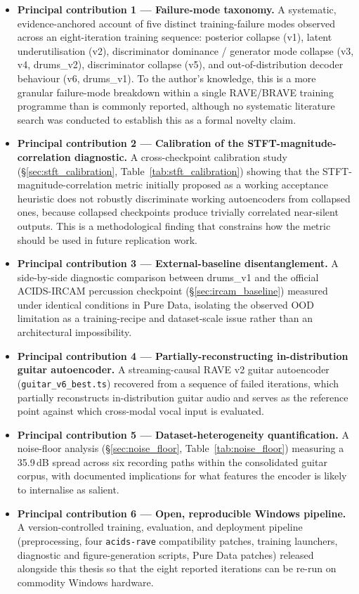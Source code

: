 \documentclass[a4paper,11pt,oneside,openany]{book}
\begin{document}
\begin{itemize}
\item \textbf{Principal contribution 1 --- Failure-mode taxonomy.} A systematic, evidence-anchored account of five distinct training-failure modes observed across an eight-iteration training sequence: posterior collapse (v1), latent underutilisation (v2), discriminator dominance / generator mode collapse (v3, v4, drums\_v2), discriminator collapse (v5), and out-of-distribution decoder behaviour (v6, drums\_v1). To the author's knowledge, this is a more granular failure-mode breakdown within a single RAVE/BRAVE training programme than is commonly reported, although no systematic literature search was conducted to establish this as a formal novelty claim.
\item \textbf{Principal contribution 2 --- Calibration of the STFT-magnitude-correlation diagnostic.} A cross-checkpoint calibration study (\S\ref{sec:stft_calibration}, Table~\ref{tab:stft_calibration}) showing that the STFT-magnitude-correlation metric initially proposed as a working acceptance heuristic does not robustly discriminate working autoencoders from collapsed ones, because collapsed checkpoints produce trivially correlated near-silent outputs. This is a methodological finding that constrains how the metric should be used in future replication work.
\item \textbf{Principal contribution 3 --- External-baseline disentanglement.} A side-by-side diagnostic comparison between drums\_v1 and the official ACIDS-IRCAM percussion checkpoint (\S\ref{sec:ircam_baseline}) measured under identical conditions in Pure Data, isolating the observed OOD limitation as a training-recipe and dataset-scale issue rather than an architectural impossibility.
\item \textbf{Principal contribution 4 --- Partially-reconstructing in-distribution guitar autoencoder.} A streaming-causal RAVE v2 guitar autoencoder (\texttt{guitar\_v6\_best.ts}) recovered from a sequence of failed iterations, which partially reconstructs in-distribution guitar audio and serves as the reference point against which cross-modal vocal input is evaluated.
\item \textbf{Principal contribution 5 --- Dataset-heterogeneity quantification.} A noise-floor analysis (\S\ref{sec:noise_floor}, Table~\ref{tab:noise_floor}) measuring a 35.9\,dB spread across six recording paths within the consolidated guitar corpus, with documented implications for what features the encoder is likely to internalise as salient.
\item \textbf{Principal contribution 6 --- Open, reproducible Windows pipeline.} A version-controlled training, evaluation, and deployment pipeline (preprocessing, four \texttt{acids-rave} compatibility patches, training launchers, diagnostic and figure-generation scripts, Pure Data patches) released alongside this thesis so that the eight reported iterations can be re-run on commodity Windows hardware.
\end{itemize}
\end{document}
